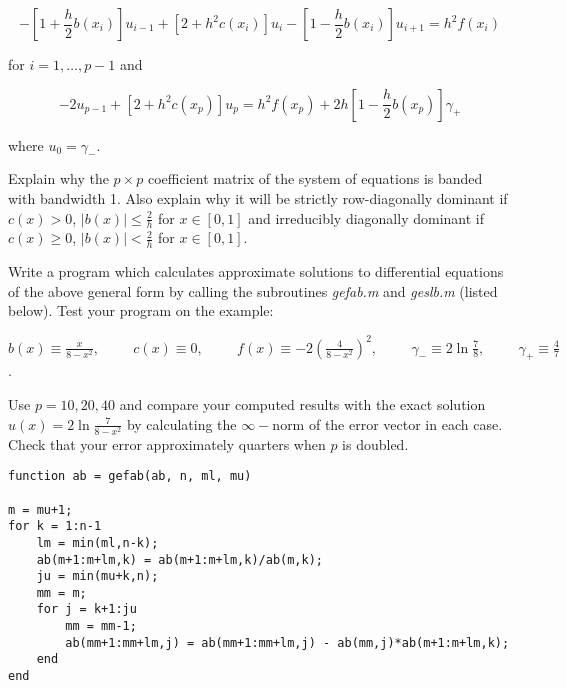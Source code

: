 \documentclass[12pt]{article}
\begin{document}
\begin{equation}
-\left [1+\frac{h}{2}b(x_i) \right ]u_{i-1} + \left [ 2 + h^2 c(x_i) \right ]u_i - \left [ 1-\frac{h}{2}b(x_i) \right ]u_{i+1} = h^2 f(x_i)
\end{equation}

for $i = 1, \ldots, p-1$ and

\begin{equation}
-2u_{p-1} + \left[2 + h^2 c(x_p) \right] u_p = h^2 f(x_p) + 2h \left[ 1 - \frac{h}{2}b(x_p) \right] \gamma_+
\end{equation}

where $u_0 = \gamma_-$.

Explain why the $p \times p$ coefficient matrix of the system of equations is banded with bandwidth 1. Also explain why it will be strictly row-diagonally dominant if $c(x) > 0$, $\lvert b(x) \rvert \leq \frac{2}{h}$ for $x \in [0,1]$ and irreducibly diagonally dominant if $c(x) \geq 0$, $\lvert b(x) \rvert < \frac{2}{h}$ for $x \in [0,1]$.

Write a program which calculates approximate solutions to differential equations of the above general form by calling the subroutines \emph{gefab.m} and \emph{geslb.m} (listed below). Test your program on the example:

$\displaystyle{b(x) \equiv \frac{x}{8-x^2}, \hspace{1cm} c(x) \equiv 0, \hspace{1cm} f(x) \equiv -2 \left(\frac{4}{8-x^2}\right)^2, \hspace{1cm} \gamma_- \equiv 2 \ln{\frac{7}{8}}, \hspace{1cm} \gamma_+ \equiv \frac{4}{7}}$.

Use $p = 10, 20, 40$ and compare your computed results with the exact solution \\ $\displaystyle{u(x) = 2 \ln{\frac{7}{8-x^2}}}$ by calculating the $\infty-$norm of the error vector in each case. Check that your error approximately quarters when $p$ is doubled.

\newpage 

\begin{lstlisting}
function ab = gefab(ab, n, ml, mu)

m = mu+1;
for k = 1:n-1
    lm = min(ml,n-k);
    ab(m+1:m+lm,k) = ab(m+1:m+lm,k)/ab(m,k);
    ju = min(mu+k,n);
    mm = m;
    for j = k+1:ju
        mm = mm-1;
        ab(mm+1:mm+lm,j) = ab(mm+1:mm+lm,j) - ab(mm,j)*ab(m+1:m+lm,k);
    end
end
\end{lstlisting}
\end{document}

